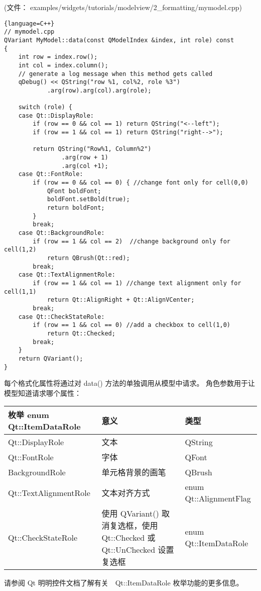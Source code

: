 (文件： examples/widgets/tutorials/modelview/2\_formatting/mymodel.cpp)

\begin{lstlisting}{language=C++}
// mymodel.cpp
QVariant MyModel::data(const QModelIndex &index, int role) const
{
    int row = index.row();
    int col = index.column();
    // generate a log message when this method gets called
    qDebug() << QString("row %1, col%2, role %3")
            .arg(row).arg(col).arg(role);

    switch (role) {
    case Qt::DisplayRole:
        if (row == 0 && col == 1) return QString("<--left");
        if (row == 1 && col == 1) return QString("right-->");

        return QString("Row%1, Column%2")
                .arg(row + 1)
                .arg(col +1);
    case Qt::FontRole:
        if (row == 0 && col == 0) { //change font only for cell(0,0)
            QFont boldFont;
            boldFont.setBold(true);
            return boldFont;
        }
        break;
    case Qt::BackgroundRole:
        if (row == 1 && col == 2)  //change background only for cell(1,2)
            return QBrush(Qt::red);
        break;
    case Qt::TextAlignmentRole:
        if (row == 1 && col == 1) //change text alignment only for cell(1,1)
            return Qt::AlignRight + Qt::AlignVCenter;
        break;
    case Qt::CheckStateRole:
        if (row == 1 && col == 0) //add a checkbox to cell(1,0)
            return Qt::Checked;
        break;
    }
    return QVariant();
}
\end{lstlisting}

每个格式化属性将通过对 data() 方法的单独调用从模型中请求。
角色参数用于让模型知道请求哪个属性：

\begin{tabular}{|l|m{15em}|l|}
	\hline
	枚举 enum Qt::ItemDataRole & 意义 &类型 \\
	\hline
	Qt::DisplayRole	 & 文本	 &QString \\
	\hline
	Qt::FontRole	& 字体	&QFont\\ 
	\hline
	BackgroundRole &	单元格背景的画笔	& QBrush\\ 
	\hline
	Qt::TextAlignmentRole	& 文本对齐方式 &enum Qt::AlignmentFlag \\
	\hline 
	Qt::CheckStateRole &	使用 QVariant() 取消复选框，使用 Qt::Checked 或 Qt::UnChecked 设置复选框 &	enum Qt::ItemDataRole \\
	\hline
\end{tabular}

请参阅 Qt 明明控件文档了解有关　Qt::ItemDataRole 枚举功能的更多信息。

